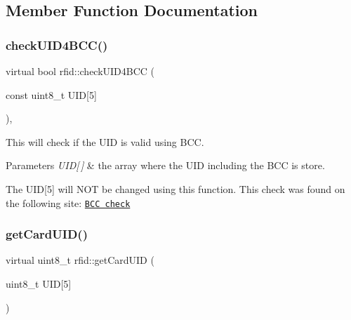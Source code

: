 \subsection{Member Function Documentation}
\mbox{\label{classrfid_a4ca2918b2b7011a6eb685ea547c21826}} 
\subsubsection{\texorpdfstring{check\+U\+I\+D4\+B\+C\+C()}{checkUID4BCC()}}
{\footnotesize\ttfamily virtual bool rfid\+::check\+U\+I\+D4\+B\+CC (\begin{DoxyParamCaption}\item[{const uint8\+\_\+t}]{U\+ID\mbox{[}5\mbox{]} }\end{DoxyParamCaption})\hspace{0.3cm}{\ttfamily [inline]}, {\ttfamily [virtual]}}



This will check if the U\+ID is valid using B\+CC. 


\begin{DoxyParams}{Parameters}
{\em U\+I\+D\mbox{[}$\,$\mbox{]}} & the array where the U\+ID including the B\+CC is store.\\
\hline
\end{DoxyParams}
The U\+ID\mbox{[}5\mbox{]} will N\+OT be changed using this function. This check was found on the following site\+: \href{http://www.proxmark.org/forum/viewtopic.php?id=2274}{\tt B\+CC check} \mbox{\label{classrfid_afeb2a321694ceaf84db793f5efb3a750}} 
\subsubsection{\texorpdfstring{get\+Card\+U\+I\+D()}{getCardUID()}}
{\footnotesize\ttfamily virtual uint8\+\_\+t rfid\+::get\+Card\+U\+ID (\begin{DoxyParamCaption}\item[{uint8\+\_\+t}]{U\+ID\mbox{[}5\mbox{]} }\end{DoxyParamCaption})\hspace{0.3cm}{\ttfamily [pure virtual]}}




